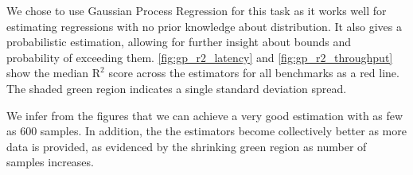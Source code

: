 We chose to use Gaussian Process Regression for this task as it works
well for estimating regressions with no prior knowledge about
distribution. It also gives a probabilistic estimation, allowing for
further insight about bounds and probability of exceeding
them. \cref{fig:gp_r2_latency} and \cref{fig:gp_r2_throughput} show
the median $\textrm{R}^2$ score across the estimators for all
benchmarks as a red line. The shaded green region indicates a single
standard deviation spread.

We infer from the figures that we can achieve a very good estimation
with as few as 600 samples. In addition, the the estimators become
collectively better as more data is provided, as evidenced by the
shrinking green region as number of samples increases.

\begin{table}[t]
  \centering


\end{table}
